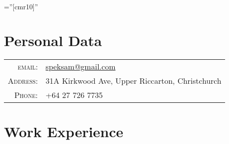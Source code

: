 \documentclass[a4paper,10pt]{article} %
\begin{document}
\pagestyle{empty} %

\font\fb=''[cmr10]'' %


\par{\smallskip\par} %

\section{Personal Data}

\begin{tabular}{rl}
\textsc{email:} & \href{mailto:speksam@gmail.com}{speksam@gmail.com} \\
\textsc{Address:} & 31A Kirkwood Ave, Upper Riccarton, Christchurch \\
\textsc{Phone:} & +64 27 726 7735 \\

\end{tabular}


\section{Work Experience}
\end{document}
